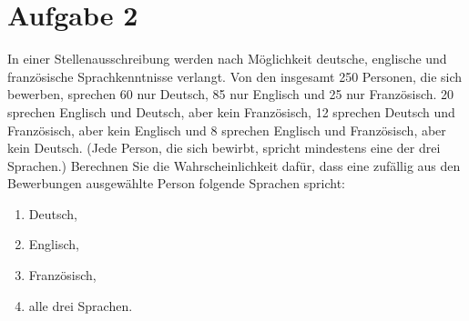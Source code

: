 \documentclass{exercise}
\begin{document}
    \section*{Aufgabe 2}

    \begin{problem}
        In einer Stellenausschreibung werden nach Möglichkeit deutsche, englische und französische Sprachkenntnisse verlangt.
        Von den insgesamt 250 Personen, die sich bewerben, sprechen 60 nur Deutsch, 85 nur Englisch und 25 nur Französisch.
        20 sprechen Englisch und Deutsch, aber kein Französisch, 12 sprechen Deutsch und Französisch, aber kein Englisch und 8 sprechen Englisch und Französisch, aber kein Deutsch.
        (Jede Person, die sich bewirbt, spricht mindestens eine der drei Sprachen.)
        Berechnen Sie die Wahrscheinlichkeit dafür, dass eine zufällig aus den Bewerbungen ausgewählte Person folgende Sprachen spricht:
        \begin{enumerate}
            \item Deutsch,
            \item Englisch,
            \item Französisch,
            \item alle drei Sprachen.
        \end{enumerate}
    \end{problem}
\end{document}

